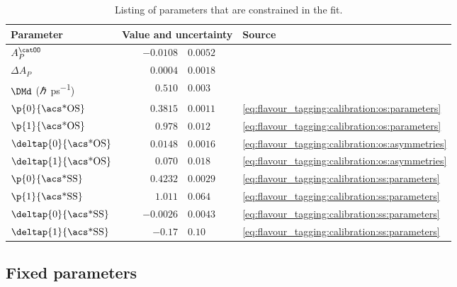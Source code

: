 \begin{table}
\caption{Listing of parameters that are constrained in the fit.}
\label{tab:measurement_of_sin2beta:cpv_measurement:constrained_parameters}
\centering
\begin{tabular}{lr@{$\,\pm\,$}ll}
  \toprule
  Parameter                        & \multicolumn{2}{l}{Value and uncertainty} & Source \\
  \midrule
  $A_P^{\catOO}$                   & $-0.0108$ & $0.0052$  & \cite{Aaij:2014bba} \\
  $\Delta A_P$                     & $0.0004$  & $0.0018$  & \cite{Aaij:2014bba,Aaij:2014nxa} \\
  $\DMd$ (\si{\planckbar\per\ps})  & $0.510$   & $0.003$   & \cite{Agashe:2014kda} \\
  $\p{0}{\text{\acs*{OS}}}$        & $0.3815$  & $0.0011$  & \cref{eq:flavour_tagging:calibration:os:parameters} \\
  $\p{1}{\text{\acs*{OS}}}$        & $0.978$   & $0.012$   & \cref{eq:flavour_tagging:calibration:os:parameters} \\
  $\deltap{0}{\text{\acs*{OS}}}$   & $0.0148$  & $0.0016$  & \cref{eq:flavour_tagging:calibration:os:asymmetries} \\
  $\deltap{1}{\text{\acs*{OS}}}$   & $0.070$   & $0.018$   & \cref{eq:flavour_tagging:calibration:os:asymmetries} \\
  $\p{0}{\text{\acs*{SS}}}$        & $0.4232$  & $0.0029$  & \cref{eq:flavour_tagging:calibration:ss:parameters} \\
  $\p{1}{\text{\acs*{SS}}}$        & $1.011$   & $0.064$   & \cref{eq:flavour_tagging:calibration:ss:parameters} \\
  $\deltap{0}{\text{\acs*{SS}}}$   & $-0.0026$ & $0.0043$  & \cref{eq:flavour_tagging:calibration:ss:parameters} \\
  $\deltap{1}{\text{\acs*{SS}}}$   & $-0.17$   & $0.10$    & \cref{eq:flavour_tagging:calibration:ss:parameters} \\
  \bottomrule
\end{tabular}
\end{table}

\FloatBarrier
\subsection{Fixed parameters}
\label{sec:measurement_of_sin2beta:cpv_measurement:fixed_parameters}


